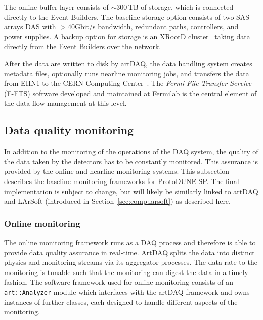 The online buffer layer consists of $\sim$300\,TB of storage,
which is connected directly to the Event Builders.  The baseline
storage option consists of two SAS arrays DAS with $>40$Gbit/s bandwidth,
redundant paths, controllers, and power supplies.
A backup option for storage is an XRootD cluster~\cite{xrootd} taking
data directly from the Event Builders over the network.

After the data are written to disk by artDAQ, the data handling
system creates metadata files, optionally  runs nearline monitoring jobs, and
transfers the data from EHN1 to the CERN Computing Center~\cite{docdb1212}.
The \textit{Fermi File Transfer Service} (F-FTS) software 
developed and maintained at Fermilab is the central element
of the data flow management at this level.


\subsection{Data quality monitoring}
\label{sec:daq_online_monitoring}

In addition to the monitoring of the operations of the DAQ system, the
quality of the data taken by the detectors has to be constantly monitored.
This assurance is provided by the online and nearline monitoring systems.
This subsection describes the baseline monitoring frameworks for ProtoDUNE-SP.  
The final implementation is subject to change, but will likely be similarly
linked to artDAQ and LArSoft (introduced in Section~\ref{sec:comp:larsoft}) as described here.

\subsubsection{Online monitoring}

The online monitoring framework runs as a DAQ process and therefore is
able to provide data quality assurance in real-time. ArtDAQ splits the  
data into distinct physics and monitoring streams via its aggregator processes.  
The data rate to the monitoring is tunable such that the monitoring 
can digest the data in a timely fashion.
The software framework used for online monitoring 
consists of an
\texttt{art::Analyzer} module which interfaces with the artDAQ framework and
owns instances of further classes, each designed to handle different aspects
of the monitoring.  

